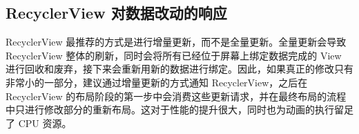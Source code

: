 


\subsection{RecyclerView 对数据改动的响应}

RecyclerView 最推荐的方式是进行增量更新，而不是全量更新。全量更新会导致 RecyclerView 整体的刷新，同时会将所有已经位于屏幕上绑定数据完成的 View 进行回收和废弃，接下来会重新用新的数据进行绑定。因此，如果真正的修改只有非常小的一部分，建议通过增量更新的方式通知 RecyclerView，之后在 RecyclerView 的布局阶段的第一步中会消费这些更新请求，并在最终布局的流程中只进行修改部分的重新布局。这对于性能的提升很大，同时也为动画的执行留足了 CPU 资源。

